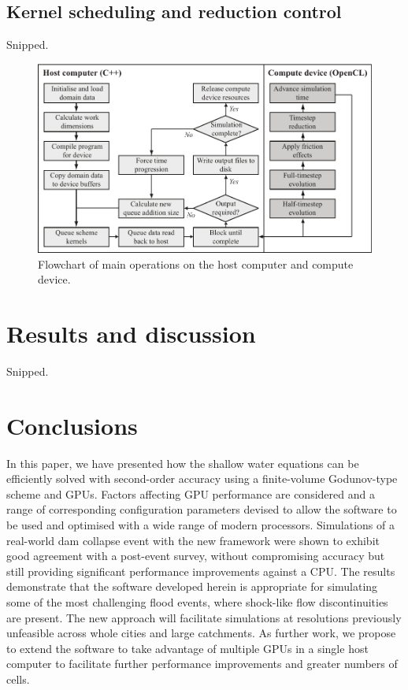 \subsection{Kernel scheduling and reduction control}

Snipped.

\begin{figure}[tpb]
\centering
\includegraphics[width=1.0\textwidth]{heterogeneous-dev-figures/Figure_7_Greyscale.pdf}
\caption{Flowchart of main operations on the host computer and compute device.}
\label{ComputerDeviceInteraction}
\end{figure}

\section{Results and discussion}

Snipped.

\section{Conclusions}

In this paper, we have presented how the shallow water equations can be efficiently solved with second-order accuracy using a finite-volume Godunov-type scheme and GPUs. Factors affecting GPU performance are considered and a range of corresponding configuration parameters devised to allow the software to be used and optimised with a wide range of modern processors. Simulations of a real-world dam collapse event with the new framework were shown to exhibit good agreement with a post-event survey, without compromising accuracy but still providing significant performance improvements against a CPU. The results demonstrate that the software developed herein is appropriate for simulating some of the most challenging flood events, where shock-like flow discontinuities are present. The new approach will facilitate simulations at resolutions previously unfeasible across whole cities and large catchments. As further work, we propose to extend the software to take advantage of multiple GPUs in a single host computer to facilitate further performance improvements and greater numbers of cells.

